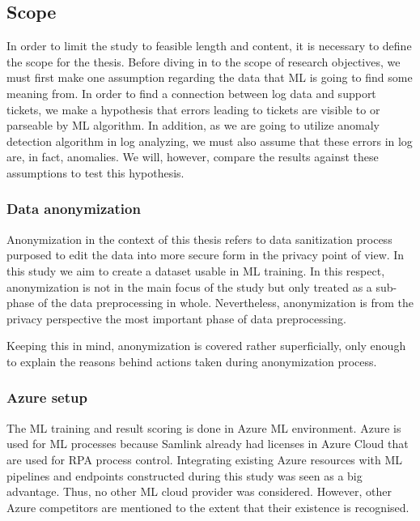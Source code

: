 
\subsection{Scope}\label{subsec:intro-scope}

In order to limit the study
to feasible length and content,
it is necessary to define the scope for the thesis.
Before diving in to the scope of research objectives,
we must first make one assumption regarding the data
that ML is going to find some meaning from.
In order to find a connection between log data and support tickets,
we make a hypothesis that errors leading to tickets
are visible to or parseable by ML algorithm.
In addition,
as we are going to utilize anomaly detection algorithm in log analyzing,
we must also assume that these errors in log
are, in fact, anomalies.
We will, however,
compare the results against these assumptions
to test this hypothesis.


\subsubsection*{Data anonymization}
Anonymization in the context of this thesis
refers to data sanitization process
purposed to edit the data into
more secure form in the privacy point of view.
In this study
we aim to create a dataset usable in ML training.
In this respect,
anonymization is not in the main focus of the study
but only treated as a sub-phase
of the data preprocessing in whole.
Nevertheless,
anonymization is from the privacy perspective
the most important phase of data preprocessing.

Keeping this in mind,
anonymization is covered rather superficially,
only enough to explain the reasons
behind actions taken during anonymization process.


\subsubsection*{Azure setup}
The ML training and result scoring
is done in Azure ML environment.
Azure is used for ML processes
because Samlink already had licenses in Azure Cloud
that are used for RPA process control.
Integrating existing Azure resources
with ML pipelines and endpoints constructed during this study
was seen as a big advantage.
Thus,
no other ML cloud provider was considered.
However,
other Azure competitors are mentioned to the extent
that their existence is recognised.

